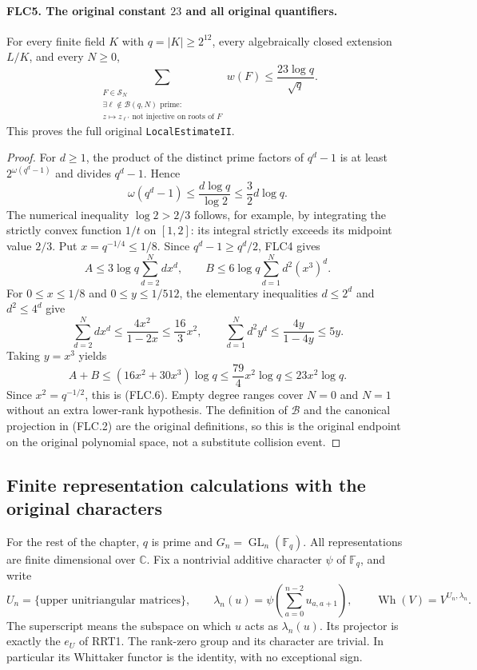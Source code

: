 \documentclass[11pt,a4paper]{article}
\numberwithin{equation}{section}
\theoremstyle{remark}\newtheorem{remark}[theorem]{Remark}
\begin{document}
\paragraph{FLC5. The original constant $23$ and all original quantifiers.}
\label{claim:FLC5}
For every finite field $K$ with $q=|K|\ge2^{12}$, every
algebraically closed extension $L/K$, and every $N\ge0$,
\[
 \sum_{\substack{F\in\mathcal S_N\\
       \exists\ell\notin\mathcal B(q,N)\text{ prime}:\\
       z\mapsto z_{\ell'}\text{ not injective on roots of }F}}
       w(F)\le\frac{23\log q}{\sqrt q}.
 \tag{FLC.6}
\]
This proves the full original \texttt{Local\allowbreak Estimate\allowbreak II}.
\begin{proof}
For $d\ge1$, the product of the distinct prime factors of
$q^d-1$ is at least $2^{\omega(q^d-1)}$ and divides $q^d-1$.
Hence
\[
 \omega(q^d-1)\le\frac{d\log q}{\log2}
                         \le\frac32d\log q.
\]
The numerical inequality $\log2>2/3$ follows, for example,
by integrating the strictly convex function $1/t$ on $[1,2]$:
its integral strictly exceeds its midpoint value $2/3$.
Put $x=q^{-1/4}\le1/8$.  Since $q^d-1\ge q^d/2$,
FLC4 gives
\[
 A\le3\log q\sum_{d=2}^N d x^d,\qquad
 B\le6\log q\sum_{d=1}^N d^2(x^3)^d.
 \tag{FLC.7}
\]
For $0\le x\le1/8$ and $0\le y\le1/512$, the elementary
inequalities $d\le2^d$ and $d^2\le4^d$ give
\[
 \sum_{d=2}^N d x^d\le\frac{4x^2}{1-2x}
                          \le\frac{16}{3}x^2,\qquad
 \sum_{d=1}^N d^2y^d\le\frac{4y}{1-4y}\le5y.
\]
Taking $y=x^3$ yields
\[
 A+B\le(16x^2+30x^3)\log q
       \le\frac{79}{4}x^2\log q
       \le23x^2\log q.
\]
Since $x^2=q^{-1/2}$, this is (FLC.6).  Empty degree ranges
cover $N=0$ and $N=1$ without an extra lower-rank hypothesis.
The definition of $\mathcal B$ and the canonical projection in
(FLC.2) are the original definitions, so this is the original
endpoint on the original polynomial space, not a substitute
collision event.
\end{proof}

\subsection{Finite representation calculations with the original characters}

For the rest of the chapter, $q$ is prime and
$G_n=\operatorname{GL}_n(\mathbb F_q)$.  All representations are
finite dimensional over $\mathbb C$.  Fix a nontrivial additive
character $\psi$ of $\mathbb F_q$, and write
\[
 U_n=\{\text{upper unitriangular matrices}\},\qquad
 \lambda_n(u)=\psi\left(\sum_{a=0}^{n-2}u_{a,a+1}\right),\qquad
 \operatorname{Wh}(V)=V^{U_n,\lambda_n}.
 \tag{FLC.8}
\]
The superscript means the subspace on which $u$ acts as
$\lambda_n(u)$.  Its projector is exactly the $e_U$ of RRT1.
The rank-zero group and its character are trivial.  In particular
its Whittaker functor is the identity, with no exceptional sign.
\end{document}
